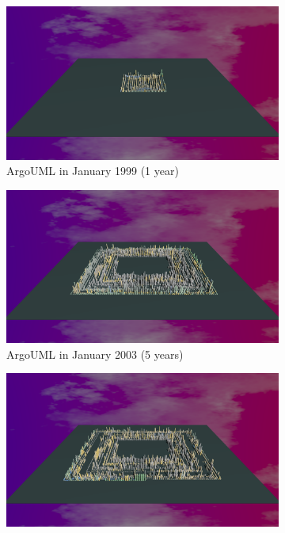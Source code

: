 \begin{figure}[ht]
    \begin{subfigure}{0.48\textwidth}
        \includegraphics[width=\linewidth]{ArgoUML/Animation001.png}
        \caption{ArgoUML in January 1999 (1 year)} 
        \label{fig:ArgoUML_V3_S1}
    \end{subfigure}\hspace*{\fill}
    \begin{subfigure}{0.48\textwidth}
        \includegraphics[width=\linewidth]{ArgoUML/Animation005.png}
        \caption{ArgoUML in January 2003 (5 years)} 
        \label{fig:ArgoUML_V3_S2}
    \end{subfigure}
    \medskip
    \begin{subfigure}{0.48\textwidth}
        \includegraphics[width=\linewidth]{ArgoUML/Animation006.png}

\end{subfigure}
\end{figure}
